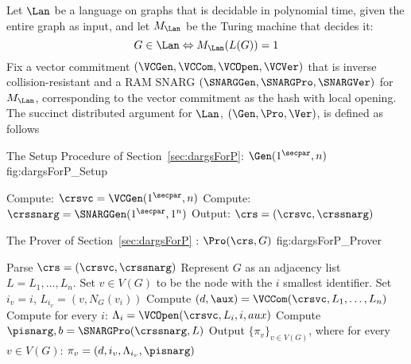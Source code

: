 Let $\Lan$ be a language on graphs that is decidable in polynomial time, given the entire graph as input, and let $M_\Lan$ be the Turing machine that decides it:
$$G\in \Lan \Leftrightarrow M_\Lan(L(G)) = 1$$
Fix a vector commitment $(\VCGen, \VCCom, \VCOpen, \VCVer)$ that is inverse collision-resistant and a RAM SNARG $(\SNARGGen, \SNARGPro, \SNARGVer)$ for $M_\Lan$, corresponding to the vector commitment as the hash with local opening. The succinct distributed argument for $\Lan$, $(\Gen, \Pro, \Ver)$, is defined as follows 
\begin{subfigures}\label{fig:dargsForP}
    \begin{nicefig}[h]{The Setup Procedure of Section~\ref{sec:dargsForP}: $\Gen(1^\secpar, n)$ }{fig:dargsForP_Setup}
        \begin{algorithmic}[1]
            \State Compute: $\crsvc = \VCGen(1^\secpar, n)$
            \State Compute: $\crssnarg = \SNARGGen(1^\secpar, 1^n)$
            \State Output: $\crs = (\crsvc, \crssnarg)$
        \end{algorithmic}
    \end{nicefig}
    
    \begin{nicefig}[h]{The Prover of Section~\ref{sec:dargsForP} : $\Pro(\crs, G)$ }{fig:dargsForP_Prover}
        \begin{algorithmic}[1]
            \State Parse $\crs=(\crsvc, \crssnarg)$
            \State Represent $G$ as an adjacency list $L = L_1,\ldots, L_n$.
                \State Set $v\in V(G)$ to be the node with the $i$ smallest identifier.
                \State Set $i_v = i$, $L_{i_v} = (v, N_G(v_i))$            
            \EndFor
            \State Compute $(d,\aux) = \VCCom(\crsvc, L_1,\ldots, L_n)$
            \State Compute for every $i$: $\Lambda_i = \VCOpen(\crsvc, L_i, i, aux)$
            \State Compute $\pisnarg, b = \SNARGPro(\crssnarg, L)$
            \State Output $\{\pi_v\}_{v\in V(G)}$, where for every $v\in V(G)$: $\pi_v = (d, i_v, \Lambda_{i_v}, \pisnarg)$
        \end{algorithmic}
    \end{nicefig}


\end{subfigures}

